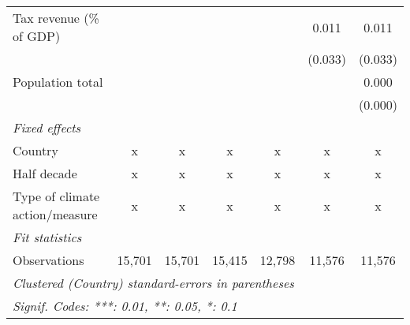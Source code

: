 \begin{tabular}{lcccccc}
   Tax revenue (\% of GDP)              &             &             &              &                & 0.011          & 0.011\\   
                                        &             &             &              &                & (0.033)        & (0.033)\\   
   Population total                     &             &             &              &                &                & 0.000\\   
                                        &             &             &              &                &                & (0.000)\\   
   \emph{Fixed effects}\\
   Country                              & x           & x           & x            & x              & x              & x\\  
   Half decade                          & x           & x           & x            & x              & x              & x\\  
   Type of climate action/measure       & x           & x           & x            & x              & x              & x\\  
   \midrule \emph{Fit statistics}\\
   Observations                         & 15,701      & 15,701      & 15,415       & 12,798         & 11,576         & 11,576\\  
   \midrule
   \multicolumn{7}{l}{\emph{Clustered (Country) standard-errors in parentheses}}\\
   \multicolumn{7}{l}{\emph{Signif. Codes: ***: 0.01, **: 0.05, *: 0.1}}\\
\end{tabular}
\par\endgroup


